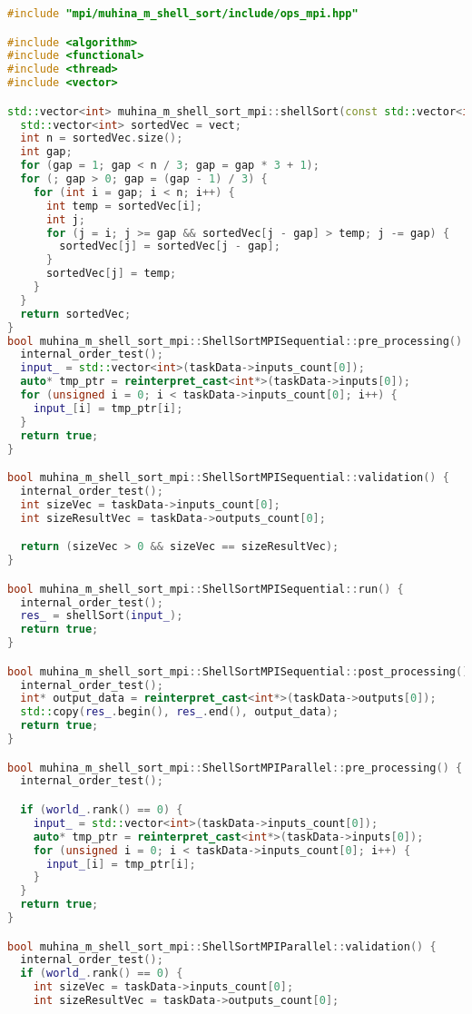 \documentclass[12pt]{article}
\begin{document}
\begin{lstlisting}[language=C++]
#include "mpi/muhina_m_shell_sort/include/ops_mpi.hpp"

#include <algorithm>
#include <functional>
#include <thread>
#include <vector>

std::vector<int> muhina_m_shell_sort_mpi::shellSort(const std::vector<int>& vect) {
  std::vector<int> sortedVec = vect;
  int n = sortedVec.size();
  int gap;
  for (gap = 1; gap < n / 3; gap = gap * 3 + 1);
  for (; gap > 0; gap = (gap - 1) / 3) {
    for (int i = gap; i < n; i++) {
      int temp = sortedVec[i];
      int j;
      for (j = i; j >= gap && sortedVec[j - gap] > temp; j -= gap) {
        sortedVec[j] = sortedVec[j - gap];
      }
      sortedVec[j] = temp;
    }
  }
  return sortedVec;
}
bool muhina_m_shell_sort_mpi::ShellSortMPISequential::pre_processing() {
  internal_order_test();
  input_ = std::vector<int>(taskData->inputs_count[0]);
  auto* tmp_ptr = reinterpret_cast<int*>(taskData->inputs[0]);
  for (unsigned i = 0; i < taskData->inputs_count[0]; i++) {
    input_[i] = tmp_ptr[i];
  }
  return true;
}

bool muhina_m_shell_sort_mpi::ShellSortMPISequential::validation() {
  internal_order_test();
  int sizeVec = taskData->inputs_count[0];
  int sizeResultVec = taskData->outputs_count[0];

  return (sizeVec > 0 && sizeVec == sizeResultVec);
}

bool muhina_m_shell_sort_mpi::ShellSortMPISequential::run() {
  internal_order_test();
  res_ = shellSort(input_);
  return true;
}

bool muhina_m_shell_sort_mpi::ShellSortMPISequential::post_processing() {
  internal_order_test();
  int* output_data = reinterpret_cast<int*>(taskData->outputs[0]);
  std::copy(res_.begin(), res_.end(), output_data);
  return true;
}

bool muhina_m_shell_sort_mpi::ShellSortMPIParallel::pre_processing() {
  internal_order_test();

  if (world_.rank() == 0) {
    input_ = std::vector<int>(taskData->inputs_count[0]);
    auto* tmp_ptr = reinterpret_cast<int*>(taskData->inputs[0]);
    for (unsigned i = 0; i < taskData->inputs_count[0]; i++) {
      input_[i] = tmp_ptr[i];
    }
  }
  return true;
}

bool muhina_m_shell_sort_mpi::ShellSortMPIParallel::validation() {
  internal_order_test();
  if (world_.rank() == 0) {
    int sizeVec = taskData->inputs_count[0];
    int sizeResultVec = taskData->outputs_count[0];


\end{lstlisting}
\end{document}
